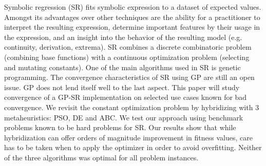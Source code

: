 Symbolic regression (SR) fits symbolic expression to a dataset of expected values. Amongst its advantages over other techniques are the ability for a practitioner to interpret the resulting expression, determine important features by their usage in the expression, and an insight into the behavior of the resulting model (e.g. continuity, derivation, extrema). SR combines a discrete combinatoric problem (combining base functions) with a continuous optimization problem (selecting and mutating constants). One of the main algorithms used in SR is genetic programming. The convergence characteristics of SR using GP are still an open issue. GP does not lend itself well to the last aspect. This paper will study convergence of a GP-SR implementation on selected use cases known for bad convergence. We revisit the constant optimization problem by hybridizing with 3 metaheuristics: PSO, DE and ABC. We test our approach using benchmark problems known to be hard problems for SR.
Our results show that while hybridization can offer orders of magnitude improvement in fitness values, care has to be taken when to apply the optimizer in order to avoid overfitting. Neither of the three algorithms was optimal for all problem instances.